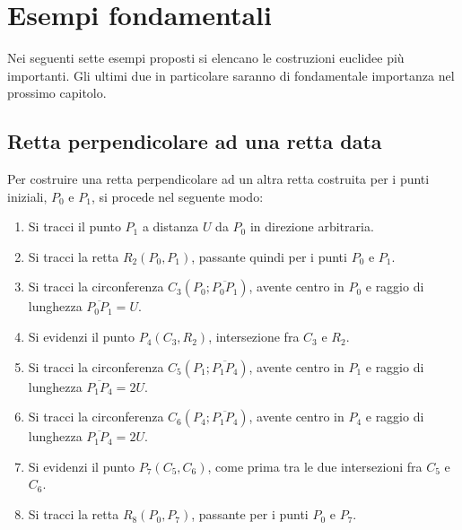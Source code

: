 \section{Esempi fondamentali}

Nei seguenti sette esempi proposti si elencano le costruzioni euclidee più importanti. Gli ultimi due in particolare saranno di fondamentale importanza nel prossimo capitolo.

%
\subsection{Retta perpendicolare ad una retta data} \label{perp}

Per costruire una retta perpendicolare ad un altra retta costruita per i punti iniziali, $P_{0}$ e $P_{1}$, si procede nel seguente modo:

\begin{enumerate}

\item Si tracci il punto $P_{1}$ a distanza $U$ da $P_{0}$ in direzione arbitraria.

\item Si tracci la retta $R_{2}(P_{0}, P_{1})$, passante quindi per i punti $P_{0}$ e $P_{1}$.

\item Si tracci la circonferenza $C_{3}(P_{0};\overline{P_{0}P_{1}})$, avente centro in $P_{0}$ e raggio di lunghezza $\overline{P_{0} P_{1}} = U$.

\item Si evidenzi il punto $P_{4}(C_{3}, R_{2} )$, intersezione fra $C_{3}$ e $R_{2}$.

\item Si tracci la circonferenza $C_{5}(P_{1};\overline{P_{1} P_{4}})$, avente centro in $P_{1}$ e raggio di lunghezza $\overline{P_{1} P_{4}} = 2U$.

\item Si tracci la circonferenza $C_{6}(P_{4};\overline{P_{1} P_{4}})$, avente centro in $P_{4}$ e raggio di lunghezza $\overline{P_{1} P_{4}} = 2U$.

\item Si evidenzi il punto  $P_{7}(C_{5}, C_{6} )$, come prima tra le due intersezioni fra $C_{5}$ e $C_{6}$.

\item Si tracci la retta $R_{8}(P_{0}, P_{7})$, passante per i punti $P_{0}$ e $P_{7}$.

\end{enumerate}

